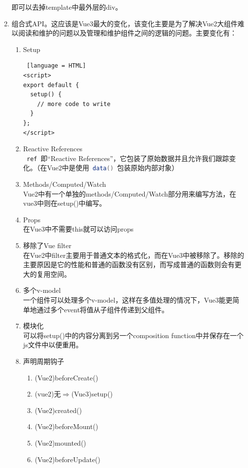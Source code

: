 \begin{enumerate}
        即可以去掉template中最外层的div。
  \item 组合式API。这应该是Vue3最大的变化，该变化主要是为了解决Vue2大组件难以阅读和维护的问题以及管理和维护组件之间的逻辑的问题。主要变化有：
        \begin{enumerate}[label=\circled{\arabic*}]
          \item Setup
                \begin{lstlisting} [language = HTML]
<script>
export default {
  setup() {
    // more code to write
  }
};
</script>
            \end{lstlisting}
          \item Reactive References\\
                \lstinline[language = Java]| ref |即“Reactive References”，它包装了原始数据并且允许我们跟踪变化。（在Vue2中是使用\lstinline[language = Java]| data() |包装原始内部对象）
          \item Methods/Computed/Watch\\
                Vue2中有一个单独的methods/Computed/Watch部分用来编写方法，在vue3中则在setup()中编写。
          \item Props\\
                在Vue3中不需要this就可以访问props
          \item 移除了Vue filter\\
                在Vue2中filter主要用于普通文本的格式化，而在Vue3中被移除了。移除的主要原因是它的性能和普通的函数没有区别，而写成普通的函数则会有更大的复用空间。
          \item 多个v-model\\
                一个组件可以处理多个v-model，这样在多值处理的情况下，Vue3能更简单地通过多个event将值从子组件传递到父组件。
          \item 模块化\\
                可以将setup()中的内容分离到另一个composition function中并保存在一个js文件中以便重用。
          \item 声明周期钩子
                \begin{enumerate}
                  \item (Vue2)beforeCreate()
                  \item (vue2)无$\Rightarrow$(Vue3)setup()
                  \item (Vue2)created()
                  \item (Vue2)beforeMount()
                  \item (Vue2)mounted()
                  \item (Vue2)beforeUpdate()

\end{enumerate}
\end{enumerate}
\end{enumerate}
